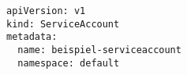 \begin{verbatim}
apiVersion: v1
kind: ServiceAccount
metadata:
  name: beispiel-serviceaccount
  namespace: default
\end{verbatim}